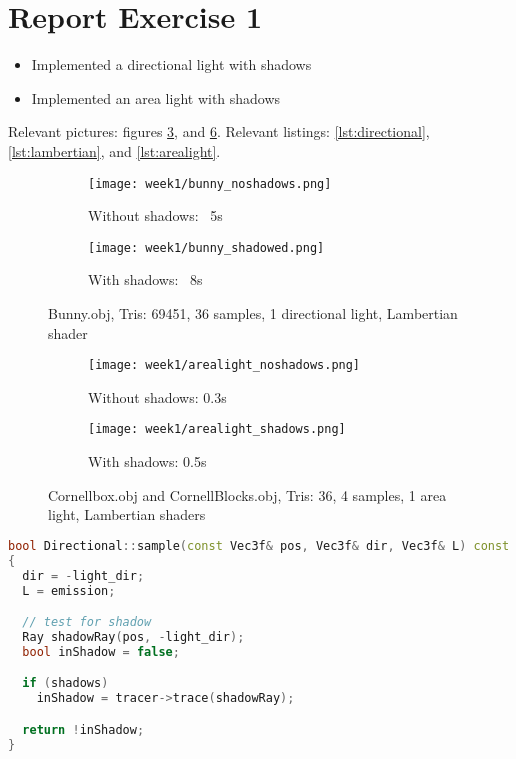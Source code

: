 \section{Report Exercise 1}

\begin{itemize}
\item{Implemented a directional light with shadows}
\item{Implemented an area light with shadows}
\end{itemize}

Relevant pictures: figures \ref{fig:shadows}, and \ref{fig:arealight}.
Relevant listings: \ref{lst:directional}, \ref{lst:lambertian}, and \ref{lst:arealight}.

\begin{figure}
	\centering
	\begin{subfigure}[b]{0.4\textwidth}
		\texttt{[image: week1/bunny\_noshadows.png]}
		\caption{Without shadows: ~5s}
		\label{fig:bunnynoshadows}
	\end{subfigure}
	\begin{subfigure}[b]{0.4\textwidth}
		\texttt{[image: week1/bunny\_shadowed.png]}
		\caption{With shadows: ~8s}
		\label{fig:bunnyshadowed}
	\end{subfigure}
	\caption{Bunny.obj, Tris: 69451, 36 samples, 1 directional light, Lambertian shader}
	\label{fig:shadows}
\end{figure}

\begin{figure}
	\centering
	\begin{subfigure}[b]{0.4\textwidth}
		\texttt{[image: week1/arealight\_noshadows.png]}
		\caption{Without shadows: 0.3s}
		\label{fig:arealightnoshadows}
	\end{subfigure}
	\begin{subfigure}[b]{0.4\textwidth}
		\texttt{[image: week1/arealight\_shadows.png]}
		\caption{With shadows: 0.5s}
		\label{fig:arealightshadows}
	\end{subfigure}
	\caption{Cornellbox.obj and CornellBlocks.obj, Tris: 36, 4 samples, 1 area light, Lambertian shaders}
	\label{fig:arealight}
\end{figure}

\newpage
\begin{lstlisting}[language=C++,caption=Directional.cpp,label=lst:directional,firstnumber=15]
bool Directional::sample(const Vec3f& pos, Vec3f& dir, Vec3f& L) const
{
  dir = -light_dir;
  L = emission;

  // test for shadow
  Ray shadowRay(pos, -light_dir);
  bool inShadow = false;

  if (shadows)
    inShadow = tracer->trace(shadowRay);

  return !inShadow;
}
\end{lstlisting}

